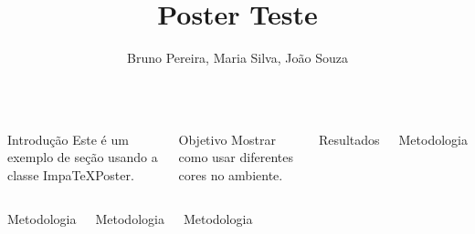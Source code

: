 \documentclass[palette=yellow,mode=light]{impaTeXPoster}
\title{Poster Teste}
\author{Bruno Pereira, Maria Silva, João Souza}
\begin{document}
\maketitle

\begin{columns}


\begin{postercard}{Introdução}
Este é um exemplo de seção usando a classe ImpaTeXPoster.

\lipsum[1]
\end{postercard}

\begin{postercard}{Objetivo}
Mostrar como usar diferentes cores no ambiente.

\lipsum[2]
\end{postercard}


\begin{postercard}{Resultados}
\lipsum[3]
\end{postercard}


\begin{postercard}{Metodologia}
\lipsum[4]
\end{postercard}

\end{columns}

\begin{columns}


\begin{postercard}{Metodologia}
\lipsum[5]
\end{postercard}


\begin{postercard}{Metodologia}
\lipsum[6]
\end{postercard}



\begin{postercard}{Metodologia}
\lipsum[7]
\end{postercard}

\end{columns}


\end{document}
